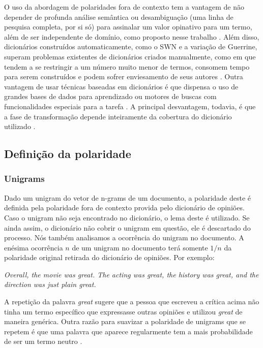 O uso da abordagem de polaridades fora de contexto tem a vantagem de não depender de profunda análise semântica ou desambiguação (uma linha de pesquisa completa, por si só) para assinalar um valor opinativo para um termo, além de ser independente de domínio, como proposto nesse trabalho \cite{guerini2013sentiment}. Além disso, dicionários construídos automaticamente, como o SWN e a variação de Guerrine, superam problemas existentes de dicionários criados manualmente, como em \cite{taboada2008extracting, taboada2011lexicon} que tendem a se restringir a um número muito menor de termos, consomem tempo para serem construídos e podem sofrer enviesamento de seus autores \cite{ohana2009sentiment}. Outra vantagem de usar técnicas baseadas em dicionários é que dispensa o uso de grandes bases de dados para aprendizado ou motores de buscas com funcionalidades especiais para a tarefa \cite{khan2011sentiment}. A principal desvantagem, todavia, é que a fase de  transformação depende inteiramente da cobertura do dicionário utilizado \cite{khan2011sentiment}. 

\subsection{Definição da polaridade}

\subsubsection{Unigrams}

Dado um unigram do vetor de n-grams de um documento, a polaridade deste é definida pela polaridade fora de contexto provida pelo dicionário de opiniões. Caso o unigram não seja encontrado no dicionário, o lema deste é utilizado. Se ainda assim, o dicionário não cobrir o unigram em questão, ele é descartado do processo.
Nós também analisamos a ocorrência do unigram no documento. A enésima ocorrência $n$ de um unigram no documento terá somente $1/n$ da polaridade original retirada do dicionário de opiniões. Por exemplo:

\textit{Overall, the movie was great. The acting was great, the history was great, and the direction was just plain great.}

A repetição da palavra \textit{great} sugere que a pessoa que escreveu a crítica acima não tinha um termo específico que expressasse outras opiniões e utilizou \textit{great} de maneira genérica. Outra razão para suavizar a polaridade de unigrams que se repetem é que uma palavra que aparece regularmente tem a mais probabilidade de ser um termo neutro \cite{taboada2011lexicon}. 

